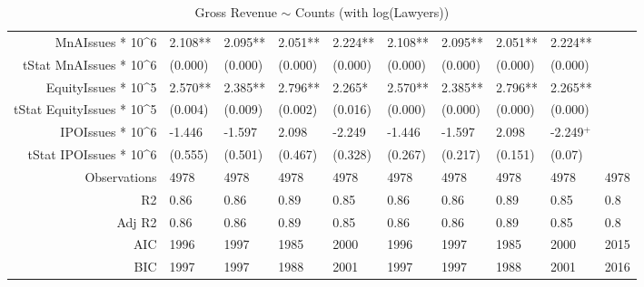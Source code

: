 \begin{table}[ht]
\begin{tabular}{rlllllllll}
  MnAIssues * 10^6 & 2.108** & 2.095** & 2.051** & 2.224** & 2.108** & 2.095** & 2.051** & 2.224** &  \\ 
  tStat MnAIssues * 10^6 & (0.000) & (0.000) & (0.000) & (0.000) & (0.000) & (0.000) & (0.000) & (0.000) &  \\ 
  EquityIssues * 10^5 & 2.570** & 2.385** & 2.796** & 2.265* & 2.570** & 2.385** & 2.796** & 2.265** &  \\ 
  tStat EquityIssues * 10^5 & (0.004) & (0.009) & (0.002) & (0.016) & (0.000) & (0.000) & (0.000) & (0.000) &  \\ 
  IPOIssues * 10^6 & -1.446 & -1.597 & 2.098 & -2.249 & -1.446 & -1.597 & 2.098 & -2.249$^{+}$ &  \\ 
  tStat IPOIssues * 10^6 & (0.555) & (0.501) & (0.467) & (0.328) & (0.267) & (0.217) & (0.151) & (0.07) &  \\ 
  Observations & 4978 & 4978 & 4978 & 4978 & 4978 & 4978 & 4978 & 4978 & 4978 \\ 
  R2 & 0.86 & 0.86 & 0.89 & 0.85 & 0.86 & 0.86 & 0.89 & 0.85 & 0.8 \\ 
  Adj R2 & 0.86 & 0.86 & 0.89 & 0.85 & 0.86 & 0.86 & 0.89 & 0.85 & 0.8 \\ 
  AIC & 1996 & 1997 & 1985 & 2000 & 1996 & 1997 & 1985 & 2000 & 2015 \\ 
  BIC & 1997 & 1997 & 1988 & 2001 & 1997 & 1997 & 1988 & 2001 & 2016 \\ 
   \hline
\end{tabular}
\caption{Gross Revenue $\sim$ Counts (with log(Lawyers))} 
\end{table}
